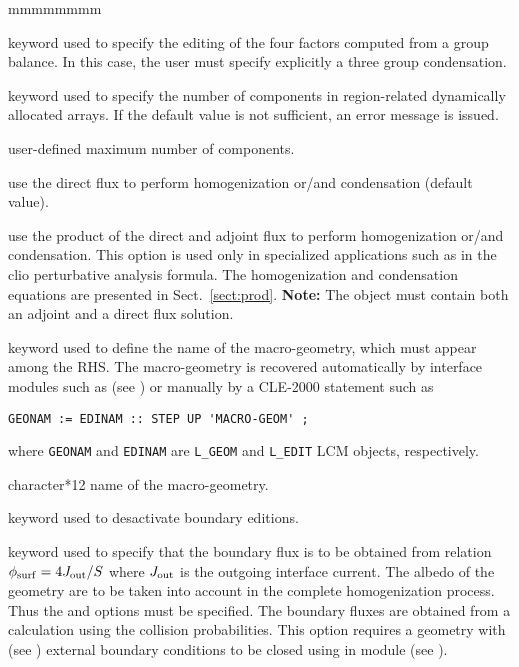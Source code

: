 \begin{ListeDeDescription}{mmmmmmmm}
\item[\moc{NBAL}] keyword used to specify the editing of the four factors computed
from a group balance. In this case, the user must specify explicitly a three
group condensation.

\item[\moc{MAXR}] keyword used to specify the number of components in
region-related dynamically allocated arrays. If the default value is
not sufficient, an error message is issued.

\item[\dusa{maxpts}] user-defined maximum number of components.

\item[\moc{DIRE}] use the direct flux to perform homogenization or/and
condensation (default value).

\item[\moc{PROD}] use the product of the direct and adjoint flux to perform homogenization or/and
condensation. This option is used only in specialized applications such as in the {\sc clio} perturbative
analysis formula.\cite{clio} The homogenization and condensation equations are presented in Sect.~\ref{sect:prod}.
{\bf Note:} The  object must contain both an adjoint and a direct flux solution.

\item[\moc{MGEO}] keyword used to define the name of the macro-geometry, which must appear among the RHS. The macro-geometry is recovered automatically
by interface modules such as  (see ) or manually by a CLE-2000 statement such as
\begin{verbatim}
GEONAM := EDINAM :: STEP UP 'MACRO-GEOM' ;
\end{verbatim}
\noindent where {\tt GEONAM} and {\tt EDINAM} are {\tt L\_GEOM} and {\tt L\_EDIT} LCM objects, respectively.

\item[\dusa{MACGEO}] character*12 name of the macro-geometry.

\item[\moc{NADF}] keyword used to desactivate boundary editions.

\item[\moc{ALBS}] keyword used to specify that the boundary flux is to be obtained from relation
$\phi_{\rm surf}=4J_{\rm out}/S$ where $J_{\rm out}$ is the outgoing interface current. The albedo of
the geometry are to be taken into account in the complete homogenization process. Thus the 
and  options must be specified. The boundary fluxes are obtained from a calculation using the collision
probabilities. This option requires a geometry with  (see ) external boundary conditions to
be closed using  in module  (see ).\cite{ALSB2}


\end{ListeDeDescription}
